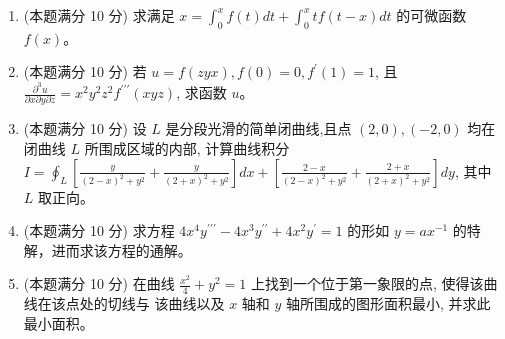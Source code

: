 \begin{enumerate}


\item 
(本题满分 10 分)
求满足 $x=\int_{0}^{x} f(t) d t+\int_{0}^{x} t f(t-x) d t$ 的可微函数 $f(x)$。




\item 
(本题满分 10 分)
若 $u=f(z y x), f(0)=0, f^{\prime}(1)=1$, 且 $\frac{\partial^{3} u}{\partial x \partial y \partial z}=x^{2} y^{2} z^{2} f^{\prime \prime \prime}(x y z)$, 求函数 $u$。




\item 
(本题满分 10 分)
设 $L$ 是分段光滑的简单闭曲线,且点 $(2,0),(-2,0)$ 均在闭曲线 $L$ 所围成区域的内部, 计算曲线积分 $I=\oint_{L}\left[\frac{y}{(2-x)^{2}+y^{2}}+\frac{y}{(2+x)^{2}+y^{2}}\right] d x+\left[\frac{2-x}{(2-x)^{2}+y^{2}}+\frac{2+x}{(2+x)^{2}+y^{2}}\right] d y$, 其中 $L$ 取正向。





\item 
(本题满分 10 分)
求方程 $4 x^{4} y^{\prime \prime \prime}-4 x^{3} y^{\prime \prime}+4 x^{2} y^{\prime}=1$ 的形如 $y=a x^{-1}$ 的特解，进而求该方程的通解。



\newpage
\item 
(本题满分 10 分)
在曲线 $\frac{x^{2}}{4}+y^{2}=1$ 上找到一个位于第一象限的点, 使得该曲线在该点处的切线与 该曲线以及 $x$ 轴和 $y$ 轴所围成的图形面积最小, 并求此最小面积。


\end{enumerate}
